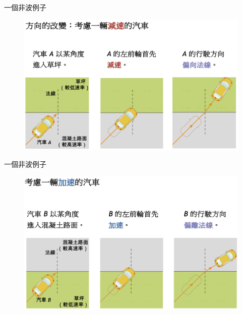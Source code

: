 \documentclass[13pt]{beamer}
\begin{document}
\begin{frame}{一個非波例子}
    \begin{figure}
        \centering
        \includegraphics[width=1\linewidth]{images/Screenshot 2023-09-27 at 9.43.07 PM.png}


    \end{figure}
\end{frame}

\begin{frame}{一個非波例子}
    \begin{figure}
        \centering
        \includegraphics[width=1\linewidth]{images/Screenshot 2023-09-27 at 9.43.15 PM.png}


    \end{figure}
\end{frame}
\end{document}
